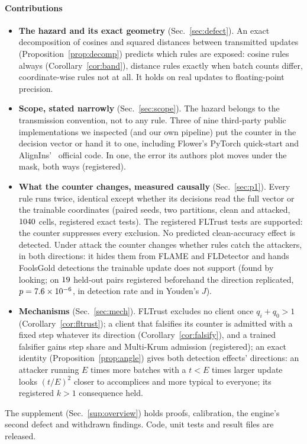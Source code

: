 \documentclass[journal]{IEEEtran}
\begin{document}
\paragraph{Contributions}
\begin{itemize}
\item \textbf{The hazard and its exact geometry} (Sec.~\ref{sec:defect}). An exact
decomposition of cosines and squared distances between transmitted updates
(Proposition~\ref{prop:decomp}) predicts which rules are exposed: cosine rules
always (Corollary~\ref{cor:band}), distance rules exactly when batch counts differ,
coordinate-wise rules not at all. It holds on real updates to floating-point precision.
\item \textbf{Scope, stated narrowly} (Sec.~\ref{sec:scope}). The hazard belongs
to the transmission convention, not to any rule. Three of nine third-party public
implementations we inspected (and our own pipeline) put the counter in the decision vector or hand it to one,
including Flower's PyTorch quick-start
and AlignIns'~\cite{xu2025alignins} official code. In one, the error its authors plot moves under the mask, both ways (registered).
\item \textbf{What the counter changes, measured causally} (Sec.~\ref{sec:p1}).
Every rule runs twice, identical except whether its decisions read the full vector
or the trainable coordinates (paired seeds, two partitions, clean and attacked, $1040$ cells,
registered exact tests). The registered FLTrust tests are
supported: the counter suppresses every exclusion. No predicted clean-accuracy effect
is detected. Under attack the counter changes whether rules catch the
attackers, in both directions: it hides them from FLAME and FLDetector and hands
FoolsGold detections the trainable update does not support (found by looking; on
$19$ held-out pairs registered beforehand the direction replicated,
$p=7.6\times10^{-6}$, in detection rate and in Youden's $J$).
\item \textbf{Mechanisms} (Sec.~\ref{sec:mech}). FLTrust excludes no client once
$q_i+q_0>1$ (Corollary~\ref{cor:fltrust}); a client that falsifies its counter is
admitted with a fixed step whatever its direction (Corollary~\ref{cor:falsify}),
and a trained falsifier gains step share and Multi-Krum admission (registered);
an exact identity (Proposition~\ref{prop:angle})
gives both detection effects' directions: an attacker running $E$ times more batches
with a $t<E$ times larger update looks $(t/E)^2$ closer to accomplices and more typical
to everyone; its registered $k>1$ consequence held.
\end{itemize}
The supplement (Sec.~\ref{sup:overview}) holds proofs, calibration, the
engine's second defect and withdrawn findings. Code, unit tests and result files are released.
\end{document}
